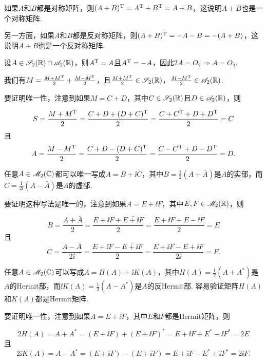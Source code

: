 \begin{solution}
  \begin{enuma}
    \item 如果$A$和$B$都是对称矩阵，则$(A+B)^{\mathrm T}=A^{\mathrm T}+B^{\mathrm T}=A+B$，这说明$A+B$也是一个对称矩阵.

        另一方面，如果$A$和$B$都是反对称矩阵，则$(A+B)^{\mathrm T}=-A-B=-(A+B)$，这说明$A+B$也是一个反对称矩阵.
    \item 设$A\in\mathscr S_2(\mathbb R)\cap\mathscr A_2(\mathbb R)$，则$A^{\mathrm T}=A$且$A^{\mathrm T}=-A$，因此$2A=O_2\Rightarrow A=O_2$.
    \item 我们有$M=\frac{M+M^{\mathrm T}}2+\frac{M-M^{\mathrm T}}2$，且$\frac{M+M^{\mathrm T}}2\in\mathscr S_2(\mathbb R)$，$\frac{M-M^{\mathrm T}}2\in\mathscr A_2(\mathbb R)$.

        要证明唯一性，注意到如果$M=C+D$，其中$C\in\mathscr S_2(\mathbb R)$且$D\in\mathscr A_2(\mathbb R)$，则
  \end{enuma}
  \[
    S = \frac{M+M^{\mathrm T}}2 = \frac{C+D+(D+C)^{\mathrm T}}2 =
    \frac{C+C^{\mathrm T}+D+D^{\mathrm T}}2 = C
  \]
  且
  \[
    A = \frac{M-M^{\mathrm T}}2 = \frac{C+D-(D+C)^{\mathrm T}}2 =
    \frac{C-C^{\mathrm T}+D-D^{\mathrm T}}2 = D.
  \]
\end{solution}

\begin{solution}
  \begin{enuma}
    \item 任意$A\in\mathscr M_2(\mathbb C)$都可以唯一写成$A=B+\ii C$，其中$B=\frac12(A+\bar A)$是$A$的{\kaishu 实部}，而$C=\frac1{2\ii}(A-\bar A)$是$A$的{\kaishu 虚部}.

        要证明这种写法是唯一的，注意到如果$A=E+\ii F$，其中$E,F\in\mathscr M_2(\mathbb R)$，则
  \end{enuma}
  \[
    B = \frac{A+\bar A}2 = \frac{E+\ii F+\bar{E+\ii F}}2 = \frac{E+\ii F+E-\ii F}2 = E
  \]
  且
  \[
    C = \frac{A-\bar A}{2\ii} = \frac{E+\ii F-\bar{E+\ii F}}2 = \frac{E+\ii F-E+\ii F}{2\ii} = F.
  \]

  \begin{enuma}\setcounter{enumi}{1}
    \item 任意$A\in\mathscr M_2(\mathbb C)$可以写成$A=H(A)+\ii K(A)$，其中$H(A)=\frac12(A+A^\ast)$是$A$的Hermit部，而$\ii K(A)=\frac12(A-A^\ast) $是$A$的反Hermit部. 容易验证矩阵$H(A)$和$K(A)$都是Hermit矩阵.

        要证明唯一性，注意到如果$A=E+\ii F$，其中$E$和$F$都是Hermit矩阵，则
  \end{enuma}
  \[
    2H(A) = A + A^\ast = (E+\ii F) + (E+\ii F)^\ast
     = E+\ii F + E^\ast - \ii F^\ast = 2E
  \]
  且
  \[
    2\ii K(A) = A - A^\ast = (E+\ii F) - (E+\ii F)
    = E+\ii F - E^\ast + \ii F^\ast = 2\ii F.
  \]
\end{solution}

